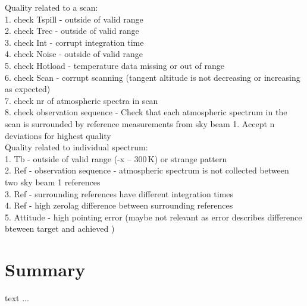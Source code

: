 Quality related to a scan:\\
    1. check Tspill  - outside of valid range \\
    2. check Trec    - outside of valid range \\
    3. check Int     - corrupt integration time \\
    4. check Noise   - outside of valid range \\
    5. check Hotload - temperature data missing or out of range \\        
    6. check Scan    - corrupt scanning (tangent altitude is not  
                            decreasing or increasing as expected) \\ 
    7. check nr of atmospheric spectra in scan\\
    8. check observation sequence - Check that each atmospheric spectrum in the 
       scan is surrounded by reference measurements from sky beam 1.
       Accept n deviations for highest quality \\


Quality related to individual spectrum:\\
    1. Tb        - outside of valid range (-x -- 300\,K) or strange pattern \\
    2. Ref       - observation sequence - atmospheric spectrum is not collected 
                   between two sky beam 1 references\\
    3. Ref       - surrounding references have different integration times \\
    4. Ref       - high zerolag difference between surrounding references  \\
    5. Attitude  - high pointing error (maybe not relevant as error describes 
                   difference bteween target and achieved ) \\




\chapter{Summary}

text ...


